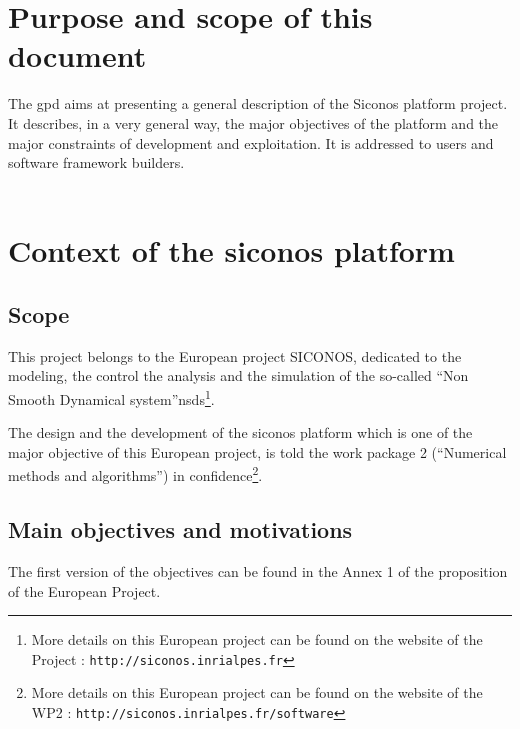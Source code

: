 \section{Purpose and scope of this document}
\label{Sec:GPD-Purpose-Scope}
The \ac{gpd} aims at presenting a general description of the Siconos platform project. It describes, in a very general way, the major objectives of the platform and the major constraints of development and exploitation. It is addressed to users and software framework builders. \\
\\


\section{Context of the \ac{siconos} platform}
\label{Sec:GPD-Context}


\subsection{Scope}
\label{Sec:SRD-Scope}

This project belongs to the European project \ac{SICONOS}, dedicated to the modeling, the control the analysis and the simulation of the so-called ``Non Smooth Dynamical system''\acs{nsds}\footnote{ More details on this European project can be found on the website of the Project : \texttt{http://siconos.inrialpes.fr}}.

The design and the development of the \ac{siconos} platform which is one of the major objective of this European project, is told the work package 2 (``Numerical methods and algorithms'')  in confidence\footnote{ More details on this European project can be found on the website of the WP2 : \texttt{http://siconos.inrialpes.fr/software}}. 

\subsection{Main objectives and motivations}
The first version of the objectives can be found in the Annex 1 of the proposition of the European Project.

